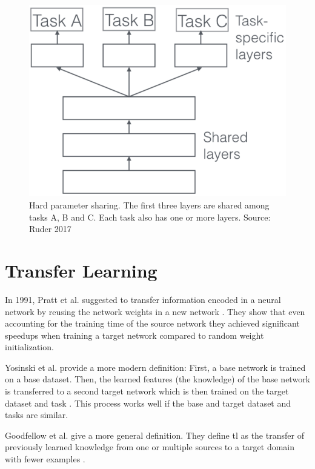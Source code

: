 \begin{figure}[ht]
	\centering
	\includegraphics[scale=0.5]{figures/03_theory/03_mtl_architecture}
	\caption{Hard parameter sharing. The first three layers are shared among tasks A, B and C. Each task also has one or more layers. Source: Ruder 2017 \cite{Ruder2017}}
	\label{fig:03_mtl_architecture}
\end{figure}



\section{Transfer Learning}
\label{sec:TransferLearning}

In 1991, Pratt et al. suggested to transfer information encoded in a neural network by reusing the network weights in a new network \cite{Pratt1991}. They show that even accounting for the training time of the source network they achieved significant speedups when training a target network compared to random weight initialization.

Yosinski et al. provide a more modern definition: First, a base network is trained on a base dataset. Then, the learned features {(the knowledge)} of the base network is transferred to a second target network which is then trained on the target dataset and task \cite{Yosinski2014}. This process works well if the base and target dataset and tasks are similar.

Goodfellow et al. give a more general definition. They define \gls{tl} as the transfer of previously learned knowledge from one or multiple sources to a target domain with fewer examples \cite{Goodfellow2016}.

